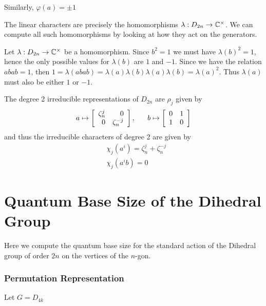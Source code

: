 Similarly, $\varphi(a) = \pm 1$ 



The linear characters are precisely the homomorphisms $\lambda : D_{2n} \rightarrow \mathbb{C}^\times$. We can compute all 
such homomorphisms by looking at how they act on the generators. 

Let $\lambda : D_{2n} \rightarrow \mathbb{C}^\times$ be a homomorphism. Since $b^2 = 1$ we must have $\lambda(b)^2 = 1$, 
hence the only possible values for $\lambda(b)$ are $1$ and $-1$. Since we have the relation $abab = 1$, then $1 = 
\lambda(abab) = \lambda(a)\lambda(b)\lambda(a)\lambda(b) = \lambda(a)^2$. Thus $\lambda(a)$ must also be either $1$ 
or $-1$.


The degree 2 irreducible representations of $D_{2n}$ are $\rho_j$ given by
\[
    a \mapsto \left[\begin{array}{rr}\zeta_n^j&0\\0&\zeta_n^{-j}\end{array}\right], \quad \ \ b \mapsto \left[\begin{array}{rr}0&1\\1&0\end{array}\right]
\]
and thus the irreducible characters of degree 2 are given by
\begin{align*}
    &\chi_j(a^i) = \zeta_n^j + \zeta_n^{-j} \\
    &\chi_j(a^ib) = 0
\end{align*}



\section{Quantum Base Size of the Dihedral Group}

Here we compute the quantum base size for the standard action of the Dihedral group of order $2n$ on the vertices 
of the $n$-gon.

\subsubsection{Permutation Representation}


Let $G = D_{4k}$
